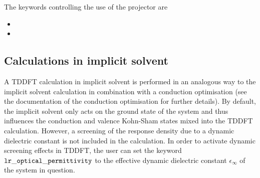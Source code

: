 \documentclass[letterpaper,10pt,english]{sphinxmanual}
\begin{document}
The keywords controlling the use of the projector are
\begin{itemize}
\item {} 

\item {} 

\end{itemize}


\subsection{Calculations in implicit solvent}
\label{\detokenize{lr_tddft:calculations-in-implicit-solvent}}
A TDDFT calculation in implicit solvent is performed in an analogous way
to the implicit solvent calculation in combination with a conduction
optimisation (see the documentation of the conduction optimisation for
further details). By default, the implicit solvent only acts on the
ground state of the system and thus influences the conduction and
valence Kohn-Sham states mixed into the TDDFT calculation. However, a
screening of the response density due to a dynamic dielectric constant
is not included in the calculation. In order to activate dynamic
screening effects in TDDFT, the user can set the keyword
\(\tt{lr\_optical\_permittivity}\) to the effective dynamic
dielectric constant \(\epsilon_\infty\) of the system in question.
\end{document}

